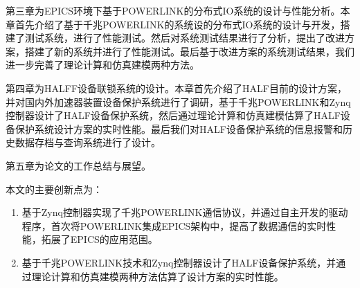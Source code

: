 第三章为EPICS环境下基于POWERLINK的分布式IO系统的设计与性能分析。本章首先介绍了基于千兆POWERLINK的系统设的分布式IO系统的设计与开发，搭建了测试系统，进行了性能测试。然后对系统测试结果进行了分析，提出了改进方案，搭建了新的系统并进行了性能测试。最后基于改进方案的系统测试结果，我们进一步完善了理论计算和仿真建模两种方法。

第四章为HALFF设备联锁系统的设计。本章首先介绍了HALF目前的设计方案，并对国内外加速器装置设备保护系统进行了调研，基于千兆POWERLINK和Zynq控制器设计了HALF设备保护系统，然后通过理论计算和仿真建模估算了HALF设备保护系统设计方案的实时性能。最后我们对HALF设备保护系统的信息报警和历史数据存档与查询系统进行了设计。

第五章为论文的工作总结与展望。


本文的主要创新点为：
\begin{enumerate}
	\item 基于Zynq控制器实现了千兆POWERLINK通信协议，并通过自主开发的驱动程序，首次将POWERLINK集成EPICS架构中，提高了数据通信的实时性能，拓展了EPICS的应用范围。
	\item 基于千兆POWERLINK技术和Zynq控制器设计了HALF设备保护系统，并通过理论计算和仿真建模两种方法估算了设计方案的实时性能。
\end{enumerate}

